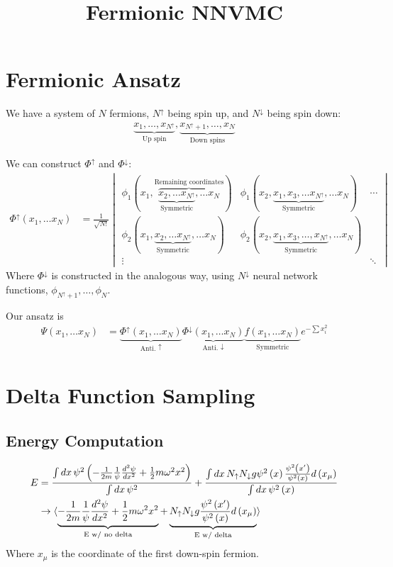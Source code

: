 \documentclass{notes}
\title{Fermionic NNVMC}
\date{}
\begin{document}
\section*{Fermionic Ansatz}
We have a system of $N$ fermions, $N^\uparrow$ being spin up, and  $N^\downarrow$  being spin down:
\begin{align*}
	\underbrace{x_1,\dots, x_{N^\uparrow}}_{\text{Up spin}}, \underbrace{x_{N^\uparrow +1}, \dots, x_N}_{\text{Down spins}}
\end{align*}


We can construct  $\Phi^\uparrow$ and  $\Phi^\downarrow$:
 \begin{align*}
	 \Phi^\uparrow(x_1,\dots x_N)&= \frac{1}{\sqrt{N!}} \begin{vmatrix}
		 \phi_1(x_1, \overbrace{\underbrace{x_2,\dots x_{N^\uparrow}}_{\text{Symmetric}}, \dots x_N}^{\text{Remaining coordinates}}) & \phi_1(x_2, \underbrace{x_1,x_3,\dots x_{N^\uparrow}}_{\text{Symmetric}}, \dots x_N) & \cdots\\ 
		 \phi_2(x_1, \underbrace{x_2, \dots x_{N^\uparrow}}_{\text{Symmetric}}, \dots x_N) & \phi_2(x_2, \underbrace{x_1,x_3,\dots, x_{N^\uparrow}}_{\text{Symmetric}}, \dots x_N)& \\ 
		 \vdots & & \ddots 
	 \end{vmatrix}
\end{align*}
Where $\Phi^\downarrow$ is constructed in the analogous way, using $N^\downarrow$ neural network functions, $\phi_{N^\uparrow +
1}, \dots, \phi_{N}$.

Our ansatz is 
\begin{align*}
	\Psi(x_1,\dots x_N) &=  \underbrace{\Phi^\uparrow(x_1,\dots x_N)}_{\text{Anti. } \uparrow} \underbrace{\Phi^\downarrow(x_1,\dots
	x_N)}_{\text{Anti. } \downarrow} \underbrace{f(x_1,\dots x_N)}_{\text{Symmetric}}e^{-\sum x_i^2}
\end{align*}


\section*{Delta Function Sampling}
\subsection*{Energy Computation}
\begin{align*}
	E &= \frac{\int dx\, \psi^2 \left(-\frac{1}{2m}\frac{1}{\psi} \frac{d^2 \psi}{dx^2} + \frac{1}{2}m\omega^2 x^2\right)}{\int dx\, \psi^2} + \frac{\int dx\, N_\uparrow
	N_\downarrow g \psi^2 \left(x\right) \frac{\psi^2\left(x'\right)}{\psi^2 \left(x\right)} d \left(x_\mu\right)}{\int dx\, \psi^2 \left(x\right)} \\ 
	  &\to \braket{\underbrace{-\frac{1}{2m}\frac{1}{\psi} \frac{d ^2\psi}{d x^2} + \frac{1}{2}m\omega^2x^2}_{\text{E w/ no delta}} + \underbrace{N_\uparrow N_\downarrow g \frac{\psi^2
	  \left(x'\right)}{\psi^2 \left(x\right)}d \left(x_\mu\right)}_{\text{E w/ delta}}}
\end{align*}
Where $x_\mu$ is the coordinate of the first down-spin fermion.
\end{document}
